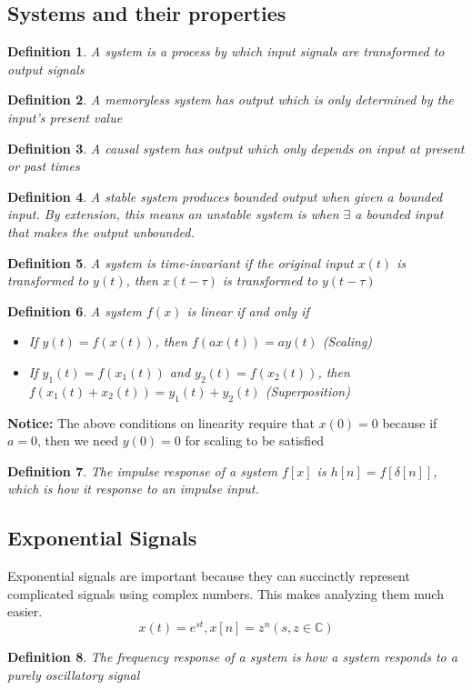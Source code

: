 \documentclass{article}
\newtheorem{definition}{Definition}
\begin{document}
\subsection{Systems and their properties}
\begin{definition}
    A system is a process by which input signals are transformed to output signals
\end{definition}
\begin{definition}
    A memoryless system has output which is only determined by the input's present value
\end{definition}
\begin{definition}
    A causal system has output which only depends on input at present or past times
\end{definition}
\begin{definition}
    A stable system produces bounded output when given a bounded input. By extension,
    this means an unstable system is when $\exists$ a bounded input that makes the output unbounded.
\end{definition}
\begin{definition}
    A system is time-invariant if the original input $x(t)$ is transformed to $y(t)$, then
    $x(t-\tau)$ is transformed to $y(t-\tau)$
\end{definition}
\begin{definition}
    A system $f(x)$ is linear if and only if
    \begin{itemize}
        \item If $y(t) = f(x(t))$, then $f(a x(t)) = a y(t)$ (Scaling)
        \item If $y_1(t) = f(x_1(t))$ and $y_2(t) = f(x_2(t))$, then $f(x_1(t) + x_2(t)) = y_1(t) + y_2(t)$ (Superposition)
    \end{itemize}
\end{definition}
\textbf{Notice: } The above conditions on linearity require that $x(0) = 0$ because if $a = 0$, then we need $y(0) = 0$ for scaling to be satisfied
\begin{definition}
    The impulse response of a system $f[x]$ is $h[n] = f[\delta[n]]$, which is how it response to an impulse input. 
\end{definition}
\subsection{Exponential Signals}
Exponential signals are important because they can succinctly represent
complicated signals using complex numbers. This makes analyzing them much easier.
$$x(t) = e^{st}, x[n] = z^n (s, z \in \mathbb{C})$$
\begin{definition}
    The frequency response of a system is how a system responds to a purely oscillatory signal
\end{definition}
\end{document}
